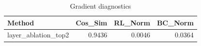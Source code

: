 \begin{table}[htbp]
\centering
\caption{Gradient diagnostics}
\label{tab:grad-diag}
\begin{tabular}{lrrr}
\toprule
\textbf{Method} & \textbf{Cos\_Sim} & \textbf{RL\_Norm} & \textbf{BC\_Norm} \\
\midrule
layer\_ablation\_top2 & 0.9436 & 0.0046 & 0.0364 \\
\bottomrule
\end{tabular}
\end{table}